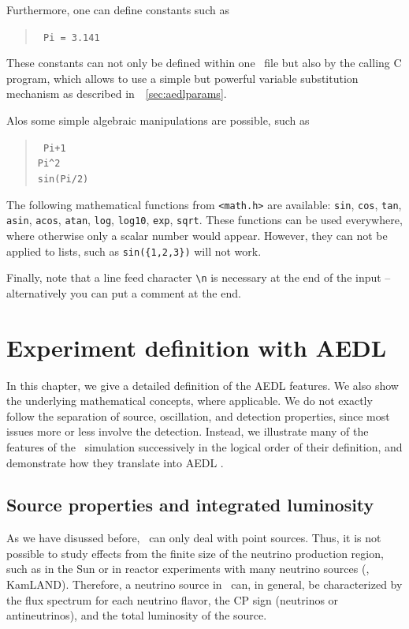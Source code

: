 Furthermore, one can define constants such as
\begin{quote}
{\tt
Pi = 3.141
}
\end{quote}
These constants can not only be defined within one \AEDL\ file but also
by the calling C program, which allows to use a simple but powerful variable
substitution mechanism as described in~\Sec~\ref{sec:aedlparams}.

Alos some simple algebraic manipulations are possible, such as
\begin{quote}
{\tt
Pi+1\\
\verb+Pi^2+\\
sin(Pi/2)\\
}
\end{quote}
The following mathematical functions from {\tt <math.h>} are available: 
{\tt sin}, {\tt cos}, {\tt tan}, {\tt asin}, {\tt acos}, {\tt atan}, 
{\tt log}, {\tt log10}, {\tt exp}, {\tt sqrt}. 
These functions can be used everywhere, where
otherwise only a scalar number would appear. However, they can not be
applied to lists, such as {\tt sin(\{1,2,3\})} will not work. 

Finally, note that a line feed character \verb+\n+ is necessary at
 the end of the input -- alternatively you can put a comment at the end.


\chapter{Experiment definition with AEDL}

In this chapter, we give a detailed definition of the AEDL features. We also show the underlying mathematical concepts, where applicable. We do not exactly follow the separation of source, oscillation, and detection properties, since most issues more or less involve the detection. Instead,
we illustrate many of the features of the \GLOBES\ simulation successively
in the logical order of their definition, and demonstrate how they translate into AEDL .

\section{Source properties and integrated luminosity}
\label{sec:source}

As we have disussed before, \GLOBES\ can only deal with point sources. Thus,  it is not possible to study effects from the finite size of the neutrino production region, such as in the Sun or in reactor experiments with many
neutrino sources (\eg, KamLAND). Therefore, a neutrino source in \GLOBES\ can, in general, be characterized by the flux spectrum for each neutrino flavor, the CP sign (neutrinos or antineutrinos), and the total luminosity
of the source.

